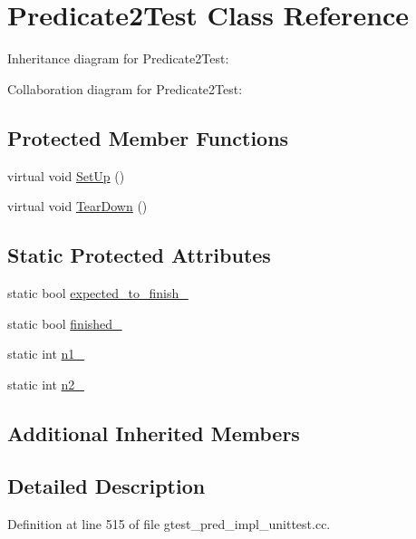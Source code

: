 \hypertarget{class_predicate2_test}{}\section{Predicate2\+Test Class Reference}
\label{class_predicate2_test}


Inheritance diagram for Predicate2\+Test\+:


Collaboration diagram for Predicate2\+Test\+:
\subsection*{Protected Member Functions}
\begin{DoxyCompactItemize}
\item 
virtual void \hyperlink{class_predicate2_test_a9778563daf4846327d32061c1a8ccba0}{Set\+Up} ()
\item 
virtual void \hyperlink{class_predicate2_test_a7379f8f7772af6b4c76edcc90b6aaaeb}{Tear\+Down} ()
\end{DoxyCompactItemize}
\subsection*{Static Protected Attributes}
\begin{DoxyCompactItemize}
\item 
static bool \hyperlink{class_predicate2_test_a56cf1f0f556addd9a62e0644dc1a86fc}{expected\+\_\+to\+\_\+finish\+\_\+}
\item 
static bool \hyperlink{class_predicate2_test_a30f4ef76d3004253078e767e5c653b85}{finished\+\_\+}
\item 
static int \hyperlink{class_predicate2_test_ac002d8e279b24e75906fd19973fc2170}{n1\+\_\+}
\item 
static int \hyperlink{class_predicate2_test_a9dbe5173570b9b911af2df889c287027}{n2\+\_\+}
\end{DoxyCompactItemize}
\subsection*{Additional Inherited Members}


\subsection{Detailed Description}


Definition at line 515 of file gtest\+\_\+pred\+\_\+impl\+\_\+unittest.\+cc.



